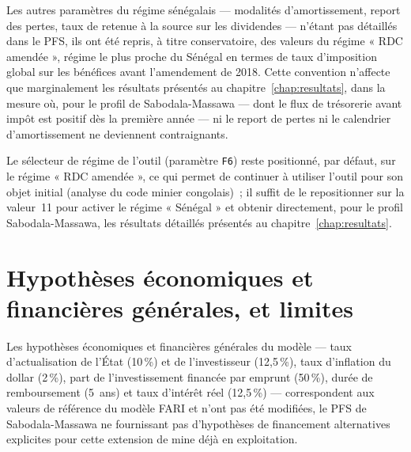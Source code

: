 Les autres paramètres du régime sénégalais --- modalités d'amortissement, report des pertes, taux de retenue à la source sur les dividendes --- n'étant pas détaillés dans le PFS, ils ont été repris, à titre conservatoire, des valeurs du régime « RDC amendée », régime le plus proche du Sénégal en termes de taux d'imposition global sur les bénéfices avant l'amendement de 2018. Cette convention n'affecte que marginalement les résultats présentés au chapitre~\ref{chap:resultats}, dans la mesure où, pour le profil de Sabodala-Massawa --- dont le flux de trésorerie avant impôt est positif dès la première année --- ni le report de pertes ni le calendrier d'amortissement ne deviennent contraignants.

Le sélecteur de régime de l'outil (paramètre \texttt{F6}) reste positionné, par défaut, sur le régime « RDC amendée », ce qui permet de continuer à utiliser l'outil pour son objet initial (analyse du code minier congolais)~; il suffit de le repositionner sur la valeur~11 pour activer le régime « Sénégal » et obtenir directement, pour le profil Sabodala-Massawa, les résultats détaillés présentés au chapitre~\ref{chap:resultats}.

\section{Hypothèses économiques et financières générales, et limites}

Les hypothèses économiques et financières générales du modèle --- taux d'actualisation de l'État (10\,\%) et de l'investisseur (12,5\,\%), taux d'inflation du dollar (2\,\%), part de l'investissement financée par emprunt (50\,\%), durée de remboursement (5~ans) et taux d'intérêt réel (12,5\,\%) --- correspondent aux valeurs de référence du modèle FARI et n'ont pas été modifiées, le PFS de Sabodala-Massawa ne fournissant pas d'hypothèses de financement alternatives explicites pour cette extension de mine déjà en exploitation.

